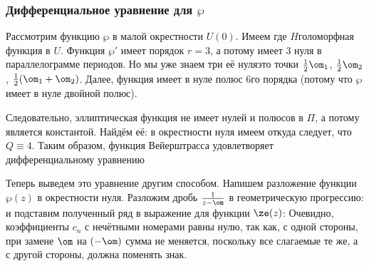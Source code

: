\documentclass[a4paper]{article}
\begin{document}
\subsubsection{Дифференциальное уравнение для $\wp$}

Рассмотрим функцию $\wp$ в малой окрестности $U(0)$. Имеем
где $H$\т голоморфная функция в $U$.
Функция $\wp'$ имеет порядок $r =3$, а потому имеет $3$ нуля в параллелограмме периодов.
Но мы уже знаем три её нуля\т это точки $\frac12\om_1$, $\frac12\om_2$, $\frac12(\om_1+\om_2)$.
Далее, функция
имеет в нуле полюс $6$\д го порядка (потому что $\wp$ имеет в нуле двойной полюс).

Следовательно, эллиптическая функция
не имеет нулей и полюсов в $\Pi$, а потому является константой.
Найдём её: в окрестности нуля имеем
откуда следует, что $Q \equiv 4$. Таким образом, функция Вейерштрасса удовлетворяет
дифференциальному уравнению

\medskip

Теперь выведем это уравнение другим способом.
Напишем разложение функции $\wp(z)$ в окрестности нуля. Разложим дробь $\frac{1}{z-\om}$
в геометрическую прогрессию:
и подставим полученный ряд в выражение для функции $\ze(z)$:
Очевидно, коэффициенты $c_n$ с нечётными номерами равны нулю, так как, с одной стороны,
при замене $\om$ на $(-\om)$ сумма не меняется, поскольку все слагаемые те же,
а с другой стороны, должна поменять знак.
\end{document}
